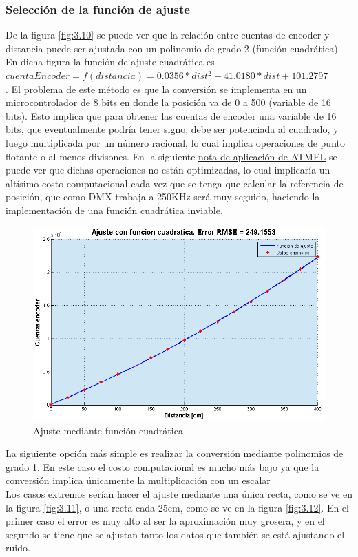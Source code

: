 \subsubsection{Selección de la función de ajuste}
De la figura \ref{fig:3.10} se puede ver que la relación entre cuentas de encoder y distancia puede ser ajustada con un polinomio de grado 2 (función cuadrática). En dicha figura la función de ajuste cuadrática es \(cuentaEncoder = f(distancia) = 0.0356*dist^2 + 41.0180*dist + 101.2797\)\\.     
El problema de este método es que la conversión se implementa en un microcontrolador de 8 bits en donde la posición va de 0 a 500 (variable de 16 bits). Esto implica que para obtener las cuentas de encoder una variable de 16 bits, que eventualmente podría tener signo, debe ser potenciada al cuadrado, y luego multiplicada por un número racional, lo cual implica operaciones de punto flotante o al menos divisones. En la siguiente \href{http://www.atmel.com/Images/doc0936.pdf}{nota de aplicación de ATMEL} se puede ver que dichas operaciones no están optimizadas, lo cual implicaría un altísimo costo computacional cada vez que se tenga que calcular la referencia de posición, que como DMX trabaja a 250KHz será muy seguido, haciendo la implementación de una función cuadrática inviable. \\

\begin{figure}[!ht]
	\centering
	\includegraphics[width=15cm,scale=1]{resources/3_10-ajusteCuadratico.png}
	\caption{Ajuste mediante función cuadrática}
	\label{fig:\thefigure}
\end{figure}

La siguiente opción más simple es realizar la conversión mediante polinomios de grado 1. En este caso el costo computacional es mucho más bajo ya que la conversión implica únicamente la multiplicación con un escalar \\
Los casos extremos serían hacer el ajuste mediante una única recta, como se ve en la figura \ref{fig:3.11}, o una recta cada 25cm, como se ve en la figura \ref{fig:3.12}. En el primer caso el error es muy alto al ser la aproximación muy grosera, y en el segundo se tiene que se ajustan tanto los datos que también se está ajustando el ruido. \\

